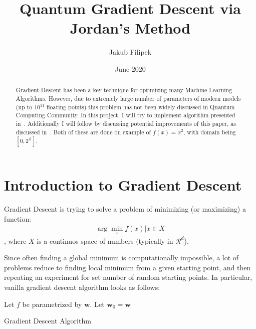 \documentclass{article}
\title{Quantum Gradient Descent via Jordan's Method}
\author{Jakub Filipek}
\date{June 2020}
\begin{document}
\maketitle

\begin{abstract}
    \noindent Gradient Descent has been a key technique for optimizing many Machine Learning Algorithms.
    However, due to extremely large number of parameters of modern models (up to $10^{11}$ floating points)
    this problem has not been widely discussed in Quantum Computing Community.
    In this project, I will try to implement algorithm presented in~\cite{Jordan_2005}.
    Additionally I will follow by discussing potential improvements of this paper, as discussed in~\cite{Gily_n_2019}.
    Both of these are done on example of $f(x) = x^2$, with domain being $[0, 2^{\vec{n}}]$.
\end{abstract}


\section{Introduction to Gradient Descent}

Gradient Descent is trying to solve a problem of minimizing (or maximizing) a function:
\begin{align}
    \arg \min \limits_x f(x) | x \in X
\end{align}, where $X$ is a continuos space of numbers (typically in $\mathcal{R}^d$).

Since often finding a global minimum is computationally impossible, a lot of problems reduce to finding local minimum from a given starting point,
and then repeating an experiment for set number of random starting points. In particular, vanilla gradient descent algorithm looks as follows:
\begin{algorithm}[h]
    \SetAlgoLined
    Let $f$ be parametrized by $\pmb{w}$. \;
    Let $\pmb{w}_0 = \pmb{w}$ \;
    \caption{Gradient Descent Algorithm}
    \label{alg:vanilla-grad-desc}
\end{algorithm}
\end{document}
